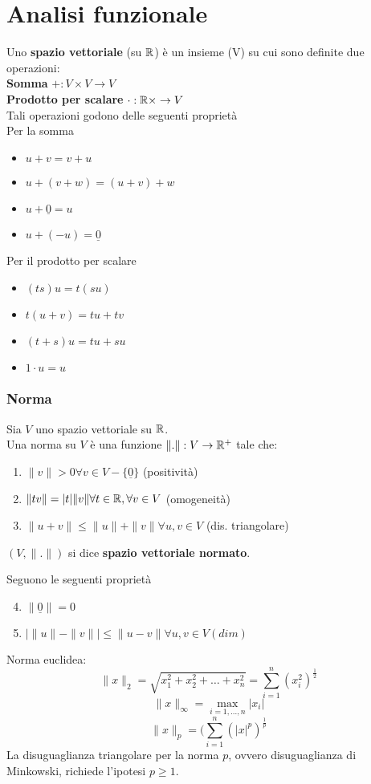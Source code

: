 
\section{Analisi funzionale}
Uno \textbf{spazio vettoriale} (su $\mathbb{R}$) è un insieme (V) su cui sono definite due operazioni:
\\\textbf{Somma} $+:V \times V\to V$
\\\textbf{Prodotto per scalare} $\cdot :\mathbb{R} \times \to V$
\\Tali operazioni godono delle seguenti proprietà
\\Per la somma
\begin{itemize}
	\item $u+v=v+u$ 
	\item $u+(v+w)=(u+v)+w$
	\item $u+\underline 0=u$
	\item $u+(-u)=\underline 0$
\end{itemize}
Per il prodotto per scalare
\begin{itemize}
	\item $(ts)u=t(su)$
	\item $t(u+v)=tu+tv$
	\item $(t+s)u=tu+su$
	\item $1\cdot u=u$
\end{itemize}
\subsubsection{Norma}
\begin{tcolorbox}
	Sia $V$ uno spazio vettoriale su $\mathbb{R}$.
	\\Una norma su $V$ è una funzione $\|.\|:V\to \mathbb{R}^+$ tale che:
	\begin{enumerate}
		\item $\|v\|>0\forall v\in V-\{\underline 0\} $ (positività)
		\item $\|tv\|=|t|\|v\|\forall t\in\mathbb{R},\forall v\in V$ (omogeneità)
		\item $\|u+v\|\le \|u\|+\|v\|\forall u,v\in V$ (dis. triangolare)
	\end{enumerate}
\end{tcolorbox}
\begin{tcolorbox}
	$(V,\|.\|)$ si dice \textbf{spazio vettoriale normato}.
\end{tcolorbox}
Seguono le seguenti proprietà
\begin{enumerate}
	\setcounter{enumi}{3}
	\item $\|\underline 0\|=0$
	\item $| \|u\|-\|v\| |\le \|u-v\|\forall u,v\in V (dim)$
\end{enumerate}
Norma euclidea:
\[\|x\|_2=\sqrt{x_1^2+x_2^2+\ldots+x_n^2} =\sum_{i=1}^{n} (x_i^2)^\frac{1}{2}\]
\[\|x\|_\infty=\max_{i=1,\ldots,n}|x_i|\]
\[\|x\|_p=(\sum_{i=1}^{n}(|x|^p)^{\frac{1}{p}}\]
La disuguaglianza triangolare per la norma $p$, ovvero disuguaglianza di Minkowski, richiede l'ipotesi $p\ge 1$.
